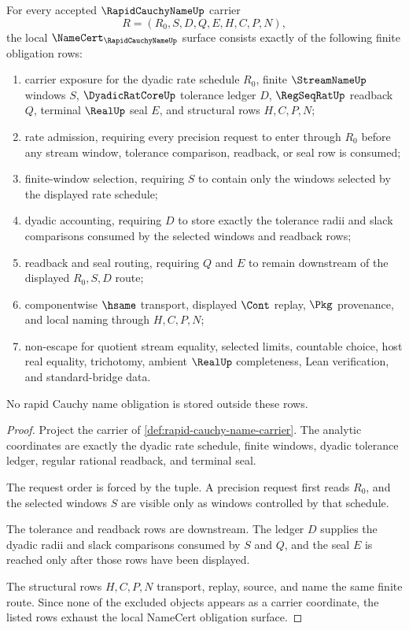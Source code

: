 \begin{theorem}
\label{thm:rapid-cauchy-name-namecert-obligations}
For every accepted $\RapidCauchyNameUp$ carrier
$$
R=(R_0,S,D,Q,E,H,C,P,N),
$$
the local $\NameCert_{\RapidCauchyNameUp}$ surface consists exactly of the following finite obligation rows:
\begin{enumerate}
\item carrier exposure for the dyadic rate schedule $R_0$, finite $\StreamNameUp$ windows $S$, $\DyadicRatCoreUp$ tolerance ledger $D$, $\RegSeqRatUp$ readback $Q$, terminal $\RealUp$ seal $E$, and structural rows $H,C,P,N$;
\item rate admission, requiring every precision request to enter through $R_0$ before any stream window, tolerance comparison, readback, or seal row is consumed;
\item finite-window selection, requiring $S$ to contain only the windows selected by the displayed rate schedule;
\item dyadic accounting, requiring $D$ to store exactly the tolerance radii and slack comparisons consumed by the selected windows and readback rows;
\item readback and seal routing, requiring $Q$ and $E$ to remain downstream of the displayed $R_0,S,D$ route;
\item componentwise $\hsame$ transport, displayed $\Cont$ replay, $\Pkg$ provenance, and local naming through $H,C,P,N$;
\item non-escape for quotient stream equality, selected limits, countable choice, host real equality, trichotomy, ambient $\RealUp$ completeness, Lean verification, and standard-bridge data.
\end{enumerate}
No rapid Cauchy name obligation is stored outside these rows.
\end{theorem}
\begin{proof}
Project the carrier of \autoref{def:rapid-cauchy-name-carrier}. The analytic coordinates are exactly the dyadic rate schedule, finite windows, dyadic tolerance ledger, regular rational readback, and terminal seal.

The request order is forced by the tuple. A precision request first reads $R_0$, and the selected windows $S$ are visible only as windows controlled by that schedule.

The tolerance and readback rows are downstream. The ledger $D$ supplies the dyadic radii and slack comparisons consumed by $S$ and $Q$, and the seal $E$ is reached only after those rows have been displayed.

The structural rows $H,C,P,N$ transport, replay, source, and name the same finite route. Since none of the excluded objects appears as a carrier coordinate, the listed rows exhaust the local NameCert obligation surface.
\end{proof}

